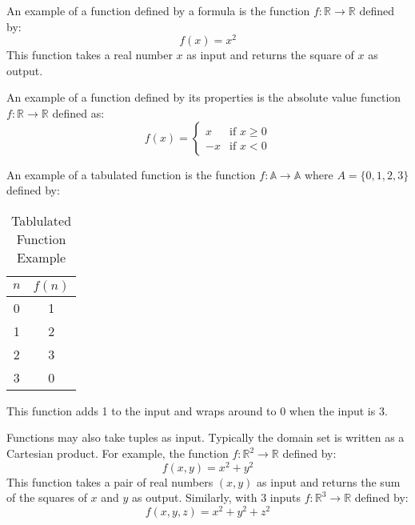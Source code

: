 An example of a function defined by a formula is the function \( f: \mathbb{R} \to \mathbb{R} \)
defined by:
\[
  f(x) = x^2
\]
\noindent This function takes a real number \( x \) as input and returns the square of \( x \) as
output.

An example of a function defined by its properties is the absolute value function
\( f: \mathbb{R} \to \mathbb{R} \) defined as:
\[
  f(x) = \begin{cases}
    x & \text{if } x \geq 0 \\
    -x & \text{if } x < 0
  \end{cases}
\]

An example of a tabulated function is the function \( f: \mathbb{A} \to \mathbb{A} \)
where \( A = \{ 0, 1, 2, 3 \}\) defined by:
\begin{table}[H]
  \centering
  \begin{tabular}{cc}
    \toprule
    \textbf{\(n\)} & \textbf{\(f(n)\)} \\
    \midrule
    0 & 1 \\
    1 & 2 \\
    2 & 3 \\
    3 & 0 \\
    \bottomrule
  \end{tabular}
  \caption{Tablulated Function Example}
\end{table}
\noindent This function adds 1 to the input and wraps around to 0 when the input is 3.

Functions may also take tuples as input. Typically the domain set is written as a Cartesian
product. For example, the function \( f: \mathbb{R}^2 \to \mathbb{R} \) defined by:
\[
  f(x, y) = x^2 + y^2
\]
\noindent This function takes a pair of real numbers \( (x, y) \) as input and returns the sum of
the squares of \( x \) and \( y \) as output. Similarly, with 3 inputs \( f: \mathbb{R}^3 \to
\mathbb{R} \) defined by:
\[
  f(x, y, z) = x^2 + y^2 + z^2
\]

